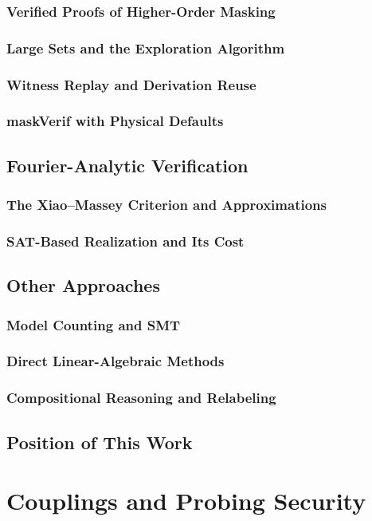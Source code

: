 \documentclass{report}
\begin{document}
  \subsection{Verified Proofs of Higher-Order Masking}
  \subsection{Large Sets and the Exploration Algorithm}
  \subsection{Witness Replay and Derivation Reuse}
  \subsection{maskVerif with Physical Defaults}
\section{Fourier-Analytic Verification} %
  \subsection{The Xiao--Massey Criterion and Approximations}
  \subsection{SAT-Based Realization and Its Cost}
\section{Other Approaches}
  \subsection{Model Counting and SMT}
  \subsection{Direct Linear-Algebraic Methods}
  \subsection{Compositional Reasoning and Relabeling}
\section{Position of This Work}

\chapter{Couplings and Probing Security}
\end{document}
